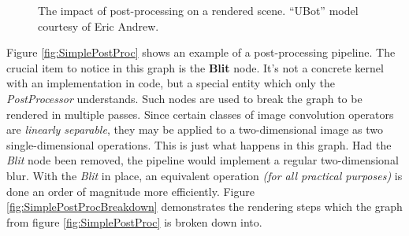 \begin{figure}[h!]
  \centering
  \caption[The impact of post-processing]{The impact of post-processing on a rendered scene. ``UBot'' model courtesy of Eric Andrew.}
\label{fig:lppFalloffBetterCase}
\end{figure}

Figure \ref{fig:SimplePostProc} shows an example of a post-processing pipeline. The crucial item to notice in this graph is the \textbf{Blit} node. It's not a concrete kernel with an implementation in code, but a special entity which only the \emph{PostProcessor} understands. Such nodes are used to break the graph to be rendered in multiple passes. Since certain classes of image convolution operators are \emph{linearly separable}, they may be applied to a two-dimensional image as two single-dimensional operations. This is just what happens in this graph. Had the \emph{Blit} node been removed, the pipeline would implement a regular two-dimensional blur. With the \emph{Blit} in place, an equivalent operation \emph{(for all practical purposes)} is done an order of magnitude more efficiently. Figure \ref{fig:SimplePostProcBreakdown} demonstrates the rendering steps which the graph from figure \ref{fig:SimplePostProc} is broken down into.


